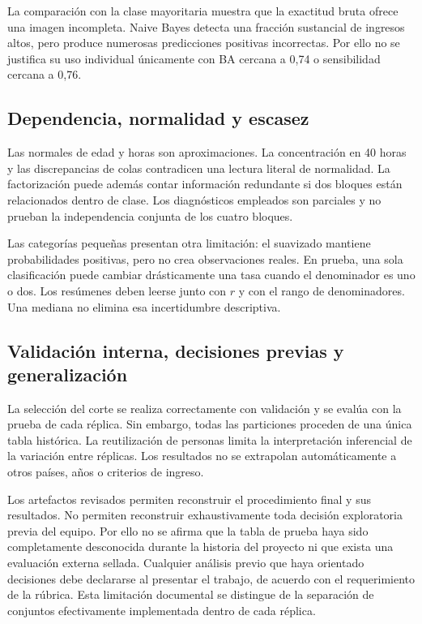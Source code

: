 \documentclass[11pt,a4paper]{article}
\begin{document}
La comparación con la clase mayoritaria muestra que la exactitud bruta ofrece una imagen incompleta. Naive Bayes detecta una fracción sustancial de ingresos altos, pero produce numerosas predicciones positivas incorrectas. Por ello no se justifica su uso individual únicamente con BA cercana a 0,74 o sensibilidad cercana a 0,76.

\subsection{Dependencia, normalidad y escasez}
Las normales de edad y horas son aproximaciones. La concentración en 40 horas y las discrepancias de colas contradicen una lectura literal de normalidad. La factorización puede además contar información redundante si dos bloques están relacionados dentro de clase. Los diagnósticos empleados son parciales y no prueban la independencia conjunta de los cuatro bloques.

Las categorías pequeñas presentan otra limitación: el suavizado mantiene probabilidades positivas, pero no crea observaciones reales. En prueba, una sola clasificación puede cambiar drásticamente una tasa cuando el denominador es uno o dos. Los resúmenes deben leerse junto con $r$ y con el rango de denominadores. Una mediana no elimina esa incertidumbre descriptiva.

\subsection{Validación interna, decisiones previas y generalización}
La selección del corte se realiza correctamente con validación y se evalúa con la prueba de cada réplica. Sin embargo, todas las particiones proceden de una única tabla histórica. La reutilización de personas limita la interpretación inferencial de la variación entre réplicas. Los resultados no se extrapolan automáticamente a otros países, años o criterios de ingreso.

Los artefactos revisados permiten reconstruir el procedimiento final y sus resultados. No permiten reconstruir exhaustivamente toda decisión exploratoria previa del equipo. Por ello no se afirma que la tabla de prueba haya sido completamente desconocida durante la historia del proyecto ni que exista una evaluación externa sellada. Cualquier análisis previo que haya orientado decisiones debe declararse al presentar el trabajo, de acuerdo con el requerimiento de la rúbrica. Esta limitación documental se distingue de la separación de conjuntos efectivamente implementada dentro de cada réplica.
\end{document}
